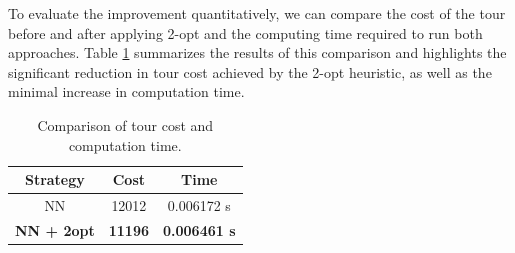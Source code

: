 To evaluate the improvement quantitatively, we can compare the cost of the tour before and after applying 2-opt and the computing time required to run both approaches. Table \ref{tab:nn-vs-2opt} summarizes the results of this comparison and highlights the significant reduction in tour cost achieved by the 2-opt heuristic, as well as the minimal increase in computation time.

\begin{table}[h!]
    \centering
    \caption{Comparison of tour cost and computation time.}
    \begin{tabular}{|c|c|c|}
        \hline
        Strategy & Cost & Time \\
        \hline
        NN        & 12012 & 0.006172 s \\
        \textbf{NN + 2opt} & \textbf{11196} & \textbf{0.006461 s} \\
        \hline
    \end{tabular}
    \label{tab:nn-vs-2opt}
\end{table}
